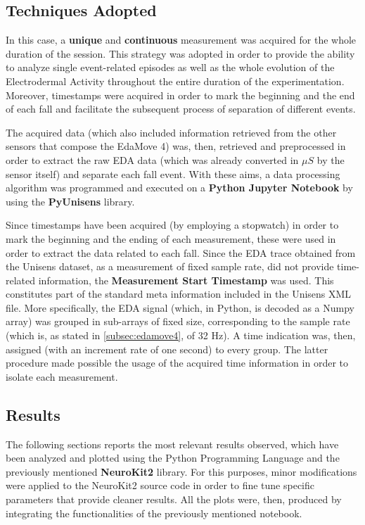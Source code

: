 \subsection{Techniques Adopted}\label{subsec:session-techniques}

In this case, a \textbf{unique} and \textbf{continuous} measurement was acquired for the whole duration of the session. This strategy was adopted in order to provide the ability to analyze single event-related episodes as well as the whole evolution of the Electrodermal Activity throughout the entire duration of the experimentation. Moreover, timestamps were acquired in order to mark the beginning and the end of each fall and facilitate the subsequent process of separation of different events.

The acquired data (which also included information retrieved from the other sensors that compose the EdaMove 4) was, then, retrieved and preprocessed in order to extract the raw EDA data (which was already converted in $\mu S$ by the sensor itself) and separate each fall event. With these aims, a data processing algorithm was programmed and executed on a \textbf{Python Jupyter Notebook} by using the \textbf{PyUnisens} library.

Since timestamps have been acquired (by employing a stopwatch) in order to mark the beginning and the ending of each measurement, these were used in order to extract the data related to each fall. Since the EDA trace obtained from the Unisens dataset, as a measurement of fixed sample rate, did not provide time-related information, the \textbf{Measurement Start Timestamp} was used. This constitutes part of the standard meta information included in the Unisens XML file. More specifically, the EDA signal (which, in Python, is decoded as a Numpy array) was grouped in sub-arrays of fixed size, corresponding to the sample rate (which is, as stated in \ref{subsec:edamove4}, of 32 Hz). A time indication was, then, assigned (with an increment rate of one second) to every group. The latter procedure made possible the usage of the acquired time information in order to isolate each measurement.

\subsection{Results}\label{subsec:results}

The following sections reports the most relevant results observed, which have been analyzed and plotted using the Python Programming Language and the previously mentioned \textbf{NeuroKit2} library. For this purposes, minor modifications were applied to the NeuroKit2 source code in order to fine tune specific parameters that provide cleaner results. All the plots were, then, produced by integrating the functionalities of the previously mentioned notebook. 

